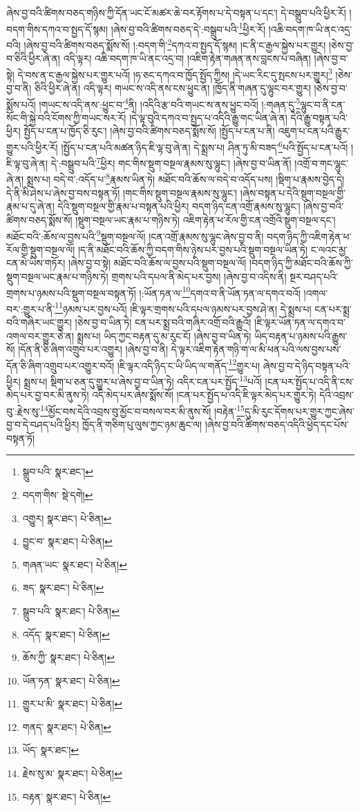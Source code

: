 ཞེས་བྱ་བའི་ཚིགས་བཅད་གཉིས་ཀྱི་དོན་ཡང་ངོ་མཚར་ཆེ་བར་རྟོགས་པ་དེ་བསྟན་པ་དང་། དེ་བསྒྲུབ་པའི་ཕྱིར་རོ། །བདག་གིས་དཀའ་བ་སྤྱད་དོ་སྙམ། །ཞེས་བྱ་བའི་ཚིགས་བཅད་དེ་:བསྒྲུབ་པའི་\footnote{སྒྲུབ་པའི་  སྣར་ཐང་། }ཕྱིར་རོ། །འཆི་བདག་ཁ་ཡི་ནང་འདྲ་བའི། །ཞེས་བྱ་བའི་ཚིགས་བཅད་སྨོས་སོ། །:བདག་གི་\footnote{བདག་གིས་  སྡེ་དགེ། }དཀའ་བ་སྤྱད་དོ་སྙམ། །ང་ནི་ང་རྒྱལ་སྐྱེས་པར་གྱུར། །ཅེས་བྱ་བ་ཅིའི་ཕྱིར་ཞེ་ན། འདི་ལྟར། འཆི་བདག་ཁ་ཡི་ནང་འདྲ་བ། །འཇིག་རྟེན་གཞན་ནས་བླངས་པ་བཞིན། །ཞེས་བྱ་བ་སྟེ། དེ་བས་ན་ང་རྒྱལ་སྐྱེས་པར་གྱུར་པའོ། །ཧ་ཅང་དཀའ་བ་ཁྱོད་སྤྱོད་ཀྱིས། །དེ་ཡང་རིང་དུ་སྤངས་པར་གྱུར།\footnote{འགྱུར།  སྣར་ཐང་།  པེ་ཅིན། } །ཅེས་བྱ་བ་ནི། ཅིའི་ཕྱིར་ཞེ་ན། འདི་ལྟར། གཡང་ས་འདི་ནས་ངས་ཕྱུང་ན། །ཁྱོད་ནི་གཞན་དུ་ལྷུང་བར་གྱུར། །ཅེས་བྱ་བ་སྨོས་པའོ། །གཡང་ས་འདི་ནས་:ཕྱུང་བ་\footnote{བྱུང་བ་  སྣར་ཐང་།  པེ་ཅིན། }ནི། །འདིའི་རྩ་བའི་གཡང་ས་ནས་ཕྱུང་བའོ། །:གཞན་དུ་\footnote{གཞན་ཡང་  སྣར་ཐང་།  པེ་ཅིན། }ལྷུང་བ་ནི་ངན་སོང་གི་སྐྱེ་བའི་ངོགས་ཀྱི་གཡང་སར་རོ། །དེ་ལྟ་བུའི་དཀའ་བ་སྤྱད་པ་འདིའི་རྒྱུ་གང་ཡིན་ཞེ་ན། དེའི་རྒྱུ་བསྟན་པའི་ཕྱིར། སྤྱོད་པ་ངན་པ་ཁྱོད་ཅི་རུང་། །ཞེས་བྱ་བའི་ཚིགས་བཅད་སྨོས་སོ། །སྤྱོད་པ་ངན་པ་ནི། འཇུག་པ་ངན་པའི་རྒྱུར་གྱུར་པའི་ཕྱིར་རོ། །སྤྱོད་པ་ངན་པའི་མཚན་ཉིད་ཇི་ལྟ་བུ་ཞེ་ན། དེ་སྨྲས་པ། ཤིན་ཏུ་མི་བཟད་\footnote{ཟད་  སྣར་ཐང་།  པེ་ཅིན། }པའི་སྤྱོད་པ་ངན་པའོ། །ཇི་ལྟ་བུ་ཞེ་ན། དེ་:བསྒྲུབ་པའི་\footnote{སྒྲུབ་པའི་  སྣར་ཐང་།  པེ་ཅིན། }ཕྱིར། གང་གིས་སྡུག་བསྔལ་རྣམས་སུ་ལྷུང་། །ཞེས་བྱ་བ་ཡིན་ནོ། །འགྲོ་བ་གང་ལྷུང་ཞེ་ན། སྨྲས་པ། བདེ་བ་:འདོད་པ་\footnote{འདོད་  སྣར་ཐང་།  པེ་ཅིན། }རྣམས་ཡིན་ཏེ། མཐོང་བའི་ཆོས་ལ་བདེ་བ་འདོད་པས། །སྡིག་པ་རྣམས་བྱེད་དེ། དེ་ནི་མི་ཤེས་པ་ཞེས་བྱ་བས་བསྟན་ཏོ། །གང་གིས་སྡུག་བསྔལ་རྣམས་སུ་ལྷུང་། །ཞེས་བསྟན་པ་དེའི་སྡུག་བསྔལ་གྱི་རྣམ་པ་དུ་ཞེ་ན། དེའི་སྡུག་བསྔལ་གྱི་རྣམ་པ་བསྟན་པའི་ཕྱིར། བདག་ཉིད་ངན་འགྲོ་རྣམས་སུ་ལྷུང་། །ཞེས་བྱ་བའི་ཚིགས་བཅད་སྨོས་སོ། །སྡུག་བསྔལ་ཡང་རྣམ་པ་གཉིས་ཏེ། འཇིག་རྟེན་ཕ་རོལ་གྱི་ངན་འགྲོའི་སྡུག་བསྔལ་དང་། མཐོང་བའི་:ཆོས་ལ་བྱས་པའི་\footnote{ཆོས་ཀྱི་  སྣར་ཐང་།  པེ་ཅིན། }སྡུག་བསྔལ་ལོ། །ངན་འགྲོ་རྣམས་སུ་ལྷུང་ཞེས་བྱ་བ་ནི། བདག་ཉིད་ཀྱི་འཇིག་རྟེན་ཕ་རོལ་གྱི་སྡུག་བསྔལ་ལོ། །ད་ནི་མཐོང་བའི་ཆོས་ཀྱི་བདག་གིས་ཉེས་པར་བྱས་པའི་སྡུག་བསྔལ་ཡིན་ཏེ། ང་ལའང་མྱ་ངན་མེ་ཡིས་གཏོར། །ཞེས་བྱ་བ་སྟེ། མཐོང་བའི་ཆོས་ལ་བྱས་པའི་སྡུག་བསྔལ་ལོ། །བདག་ཉིད་ཀྱི་མཐོང་བའི་ཆོས་ཀྱི་སྡུག་བསྔལ་ཡང་རྣམ་པ་གཉིས་ཏེ། གྲགས་པའི་དཔལ་ནི་མེད་པར་བྱས། །ཞེས་བྱ་བ་འདིས་ནི། སྔར་བཤད་པའི་གྲགས་པ་ཉམས་པའི་སྡུག་བསྔལ་བསྟན་ཏོ། །:ཡོན་ཏན་ལ་\footnote{ཡོན་ཏན་  སྣར་ཐང་།  པེ་ཅིན། }དགའ་བ་ནི་ཡོན་ཏན་ལ་དགའ་བའོ། །འགལ་བར་:གྱུར་པ་ནི་\footnote{གྱུར་པ་མི་  སྣར་ཐང་།  པེ་ཅིན། }ཉམས་པར་བྱས་པའོ། །ཇི་ལྟར་གྲགས་པའི་དཔལ་ཉམས་པར་བྱས་ཤེ་ན། དེ་སྨྲས་པ། ངན་པར་སྨྲ་བའི་གཞིར་ཡང་གྱུར། །ཅེས་བྱ་བ་ཡིན་ཏེ། ངན་པར་སྨྲ་བའི་གཞིར་འགྲོ་བའི་རྒྱུའོ། །ཇི་ལྟར་ཡོན་ཏན་ལ་དགའ་བ་འགལ་བར་གྱུར་ཅེ་ན། སྨྲས་པ། ཡིད་ཀྱང་བརྟན་དུ་མ་རུང་ངོ། །ཞེས་བྱ་བ་ཡིན་ཏེ། ཡིད་བརྟན་པ་ཉམས་པའི་རྒྱུས་སོ། །དོན་ནི་ཅི་ཞིག་འགྲུབ་པར་འགྱུར། །ཞེས་བྱ་བ་ནི། དེ་ལྟར་འཇིག་རྟེན་གཉི་ག་ལ་མི་ཕན་པའི་ལས་བྱས་པས་དོན་ཅི་ཞིག་འགྲུབ་པར་འགྱུར་བའོ། །ཇི་ལྟར་འདི་ཉིད་ང་ཡི་ཡིད་ལ་གནོད་\footnote{གནད་  སྣར་ཐང་།  པེ་ཅིན། }གྱུར་པ། ཞེས་བྱ་བ་དེ་ཉིད་བསྟན་པའི་ཕྱིར། སྨྲས་པ། སྡིག་པ་ཅན་དུ་གྱུར་པ་ཞེས་བྱ་བ་ཡིན་ཏེ། འདིར་ངན་པར་སྤྱོད་\footnote{ཡོད་  སྣར་ཐང་། }པའོ། །ངན་པར་སྤྱོད་པ་འདི་ནི་ངས་མེད་པར་བྱ་བར་མི་ནུས་ཏེ། འདི་མེད་པར་ཞེས་སྨོས་སོ། །ངན་པར་སྤྱོད་པ་འདི་ཇི་ལྟར་མེད་པར་གྱུར་ཏེ། དེའི་འབྲས་བུ་:རྗེས་སུ་\footnote{རྗེས་སུ་མ་  སྣར་ཐང་།  པེ་ཅིན། }མྱོང་བས་དེའི་འབྲས་བུ་མྱོང་བ་བསལ་བར་མི་ནུས་སོ། །བརྟེན་\footnote{བརྟན་  སྣར་ཐང་།  པེ་ཅིན། }དུ་མི་རུང་དོགས་པར་གྱུར་ཀྱང་ཞེས་བྱ་བ་དེ་བཤད་པའི་ཕྱིར། ཁྱོད་ནི་གཅིག་པུ་ལུས་ཀྱང་ཉམ་ཆུང་ལ། །ཞེས་བྱ་བའི་ཚིགས་བཅད་འདིའི་ཕྱེད་དང་པོས་བསྟན་ཏོ། 